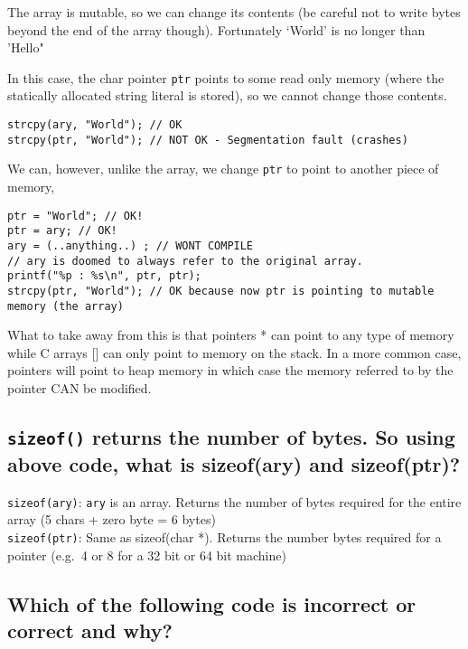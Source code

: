 The array is mutable, so we can change its contents (be careful not to
write bytes beyond the end of the array though). Fortunately `World' is
no longer than 'Hello"

In this case, the char pointer \texttt{ptr} points to some read only
memory (where the statically allocated string literal is stored), so we
cannot change those contents.

\begin{verbatim}
strcpy(ary, "World"); // OK
strcpy(ptr, "World"); // NOT OK - Segmentation fault (crashes)
\end{verbatim}

We can, however, unlike the array, we change \texttt{ptr} to point to
another piece of memory,

\begin{verbatim}
ptr = "World"; // OK!
ptr = ary; // OK!
ary = (..anything..) ; // WONT COMPILE
// ary is doomed to always refer to the original array.
printf("%p : %s\n", ptr, ptr);
strcpy(ptr, "World"); // OK because now ptr is pointing to mutable memory (the array)
\end{verbatim}

What to take away from this is that pointers * can point to any type of
memory while C arrays {[}{]} can only point to memory on the stack. In a
more common case, pointers will point to heap memory in which case the
memory referred to by the pointer CAN be modified.

\subsection{\texorpdfstring{\texttt{sizeof()} returns the number of
bytes. So using above code, what is sizeof(ary) and
sizeof(ptr)?}{sizeof() returns the number of bytes. So using above code, what is sizeof(ary) and sizeof(ptr)?}}\label{sizeof-returns-the-number-of-bytes.-so-using-above-code-what-is-sizeofary-and-sizeofptr}

\texttt{sizeof(ary)}: \texttt{ary} is an array. Returns the number of
bytes required for the entire array (5 chars + zero byte = 6
bytes)\\\texttt{sizeof(ptr)}: Same as sizeof(char *). Returns the number
bytes required for a pointer (e.g.~4 or 8 for a 32 bit or 64 bit
machine)

\subsection{Which of the following code is incorrect or correct and
why?}\label{which-of-the-following-code-is-incorrect-or-correct-and-why}

